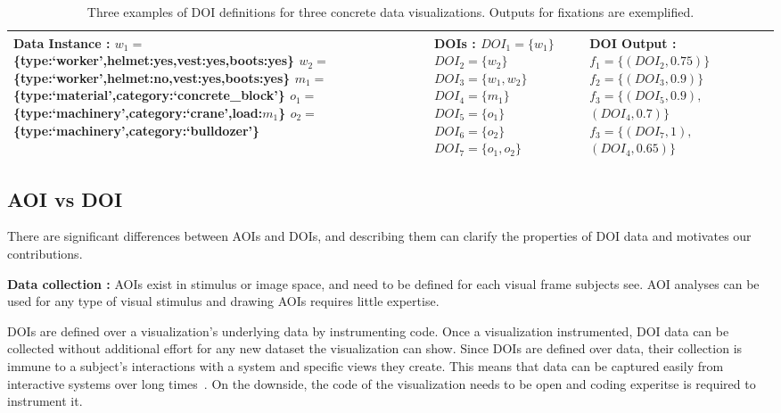 \begin{table}[htbp]
\begin{tabular}{|l|l|l|}
		 \shortstack[l]{\textbf{Data Instance :}\\
							$w_1=$\{type:`worker',helmet:yes,vest:yes,boots:yes\}\\
							$w_2=$\{type:`worker',helmet:no,vest:yes,boots:yes\}\\
							$m_1 =$ \{type:`material',category:`concrete\_block'\}\\						
							$o_1 =$ \{type:`machinery',category:`crane',load:$m_1$\}\\
							$o_2 =$ \{type:`machinery',category:`bulldozer'\}
							}
		& \shortstack[l]{\textbf{DOIs :}
							$DOI_1 = \{w_1\}$\\
							$DOI_2 = \{w_2\}$\\
							$DOI_3 = \{w_1, w_2\}$\\
							$DOI_4 = \{m_1\}$\\
							$DOI_5 = \{o_1\}$\\
							$DOI_6 = \{o_2\}$\\
							$DOI_7 = \{o_1,o_2\}$
		}									
		&\shortstack[l]{\textbf{DOI Output :}\\
							$f_1 = \{(DOI_2,0.75)\}$\\
							$f_2 = \{(DOI_3,0.9)\}$\\
							$f_3=\{(DOI_5, 0.9),$\\$(DOI_4, 0.7)\}$\\
							$f_3=\{(DOI_7, 1),$\\$(DOI_4, 0.65)\}$
							}
		\\\hline
		\end{tabular}
		\caption{Three examples of DOI definitions for three concrete data visualizations. Outputs for fixations are exemplified.}
		\label{tab:ExampleDOI}
\end{table} 

\subsection{AOI vs DOI}
\label{sec:AOIvDOI}
There are significant differences between AOIs and DOIs, and describing them can clarify the properties of DOI data and motivates our contributions.

\noindent \textbf{Data collection :} AOIs exist in stimulus or image space, and need to be defined for each visual frame subjects see. AOI analyses can be used for any type of visual stimulus and drawing AOIs requires little expertise. 

DOIs are defined over a visualization's underlying data by instrumenting code. Once a visualization instrumented, DOI data can be collected without additional effort for any new dataset the visualization can show. Since DOIs are defined over data, their collection is immune to a subject's interactions with a system and specific views they create. This means that data can be captured easily from interactive systems over long times~\cite{alam15analyzing}. On the downside, the code of the visualization needs to be open and coding experitse is required to instrument it.

